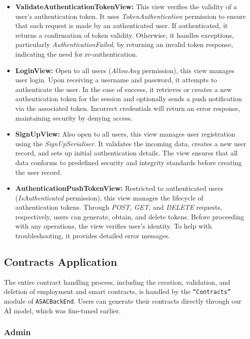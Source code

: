 \begin{itemize}
    \item \textbf{ValidateAuthenticationTokenView:} This view verifies the validity of a user's authentication token. It uses \textit{TokenAuthentication} permission to ensure that each request is made by an authenticated user. If authenticated, it returns a confirmation of token validity. Otherwise, it handles exceptions, particularly \textit{AuthenticationFailed}, by returning an invalid token response, indicating the need for re-authentication.
    \item \textbf{LoginView:} Open to all users (\textit{AllowAny} permission), this view manages user login. Upon receiving a username and password, it attempts to authenticate the user. In the case of success, it retrieves or creates a new authentication token for the session and optionally sends a push notification via the associated token. Incorrect credentials will return an error response, maintaining security by denying access.
    \item \textbf{SignUpView:} Also open to all users, this view manages user registration using the \textit{SignUpSerialiser}. It validates the incoming data, creates a new user record, and sets up initial authentication details. The view ensures that all data conforms to predefined security and integrity standards before creating the user record.
    \item \textbf{AuthenticationPushTokenView:} Restricted to authenticated users (\textit{IsAuthenticated} permission), this view manages the lifecycle of authentication tokens. Through \textit{POST}, \textit{GET}, and \textit{DELETE} requests, respectively, users can generate, obtain, and delete tokens. Before proceeding with any operations, the view verifies user's identity. To help with troubleshooting, it provides detailed error messages.
\end{itemize}

\subsection{Contracts Application}

The entire contract handling process, including the creation, validation, and deletion of employment and smart contracts, is handled by the \texttt{``Contracts''} module of \texttt{ASACBackEnd}. Users can generate their contracts directly through our AI model, which was fine-tuned earlier.

\subsubsection{Admin} 

